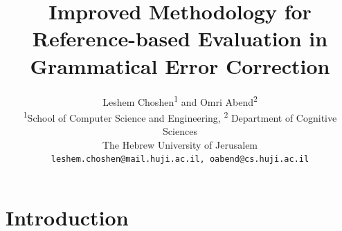 \documentclass[english]{article}
\begin{document}
	
\title{Improved Methodology for Reference-based Evaluation in \\
  Grammatical Error Correction}

\author{
  Leshem Choshen\textsuperscript{1} and Omri Abend\textsuperscript{2} \\
  \textsuperscript{1}School of Computer Science and Engineering,
  \textsuperscript{2} Department of Cognitive Sciences \\
  The Hebrew University of Jerusalem \\
  \texttt{leshem.choshen@mail.huji.ac.il, oabend@cs.huji.ac.il}\\
}


\maketitle

\begin{abstract}
	
\end{abstract}

\section{Introduction}



\end{document}
